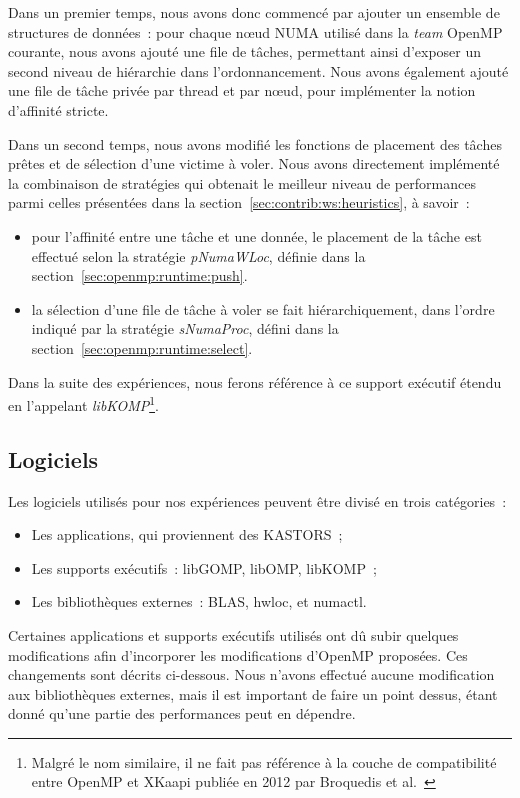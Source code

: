 Dans un premier temps, nous avons donc commencé par ajouter un ensemble de structures de données~: pour chaque nœud NUMA utilisé dans la \emph{team} OpenMP courante, nous avons ajouté une file de tâches, permettant ainsi d'exposer un second niveau de hiérarchie dans l'ordonnancement.
Nous avons également ajouté une file de tâche privée par thread et par nœud, pour implémenter la notion d'affinité stricte.

Dans un second temps, nous avons modifié les fonctions de placement des tâches prêtes et de sélection d'une victime à voler.
Nous avons directement implémenté la combinaison de stratégies qui obtenait le meilleur niveau de performances parmi celles présentées dans la section~\ref{sec:contrib:ws:heuristics}, à savoir~:
\begin{itemize}
  \item pour l'affinité entre une tâche et une donnée, le placement de la tâche est effectué selon la stratégie \emph{pNumaWLoc}, définie dans la section~\ref{sec:openmp:runtime:push}.
  \item la sélection d'une file de tâche à voler se fait hiérarchiquement, dans l'ordre indiqué par la stratégie \emph{sNumaProc}, défini dans la section~\ref{sec:openmp:runtime:select}.
\end{itemize}

Dans la suite des expériences, nous ferons référence à ce support exécutif étendu en l'appelant \emph{libKOMP}\footnote{Malgré le nom similaire, il ne fait pas référence à la couche de compatibilité entre OpenMP et XKaapi publiée en 2012 par Broquedis et al.~\cite{Broquedis2012}}.


\subsection{Logiciels}\label{sec:contribs:perf_eval:logiciels}

Les logiciels utilisés pour nos expériences peuvent être divisé en trois catégories~:
\begin{itemize}
  \item Les applications, qui proviennent des KASTORS~;
  \item Les supports exécutifs~: libGOMP, libOMP, libKOMP~;
  \item Les bibliothèques externes~: BLAS, hwloc, et numactl.
\end{itemize}

Certaines applications et supports exécutifs utilisés ont dû subir quelques modifications afin d'incorporer les modifications d'OpenMP proposées.
Ces changements sont décrits ci-dessous.
Nous n'avons effectué aucune modification aux bibliothèques externes, mais il est important de faire un point dessus, étant donné qu'une partie des performances peut en dépendre.

